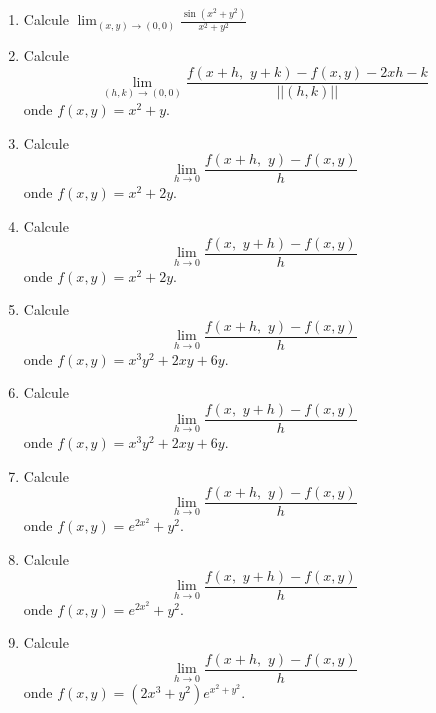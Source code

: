\documentclass[11pt,a4paper]{article}
\newcommand{\limite}{\displaystyle\lim}
\begin{document}
\begin{enumerate}
	
	
	
	
	
	
	
	
	
	
	
	
	
	
	

	
	
	\item Calcule $\limite_{(x,y) \to (0,0)} \displaystyle\frac{\sin (x^2 + y^2)}{x^2 + y^2}$
	
	\item Calcule
	$$\limite_{(h,k) \to (0,0)} \displaystyle\frac{f(x + h,\,\, y + k) - f(x,y) - 2xh - k}{||(h,k)||}$$
	onde $f(x,y) = x^2 + y$.

	\item Calcule
	$$\limite_{h \to 0} \displaystyle\frac{f(x + h,\,\, y) - f(x,y)}{h}$$
	onde $f(x,y) = x^2 + 2y$.
	
	\item Calcule
	$$\limite_{h \to 0} \displaystyle\frac{f(x,\,\, y + h) - f(x,y)}{h}$$
	onde $f(x,y) = x^2 + 2y$.
	
	\item Calcule
	$$\limite_{h \to 0} \displaystyle\frac{f(x + h,\,\, y) - f(x,y)}{h}$$
	onde $f(x,y) = x^3y^2 + 2xy + 6y$.	
	
	\item Calcule
	$$\limite_{h \to 0} \displaystyle\frac{f(x,\,\, y + h) - f(x,y)}{h}$$
	onde $f(x,y) = x^3y^2 + 2xy + 6y$.
	
	\item Calcule
	$$\limite_{h \to 0} \displaystyle\frac{f(x + h,\,\, y) - f(x,y)}{h}$$
	onde $f(x,y) = e^{2x^2} + y^2$.
	
	\item Calcule
	$$\limite_{h \to 0} \displaystyle\frac{f(x,\,\, y + h) - f(x,y)}{h}$$
	onde $f(x,y) = e^{2x^2} + y^2$.
	
	
	
	
	
	
	
	
	
	
	
	
	
	
	
	
	
	
	
	
	
	
	
	
	\item Calcule
	$$\limite_{h \to 0} \displaystyle\frac{f(x + h,\,\, y) - f(x,y)}{h}$$
	onde $f(x,y) = (2x^3 + y^2)e^{x^2 + y^2}$.
	

\end{enumerate}
\end{document}
